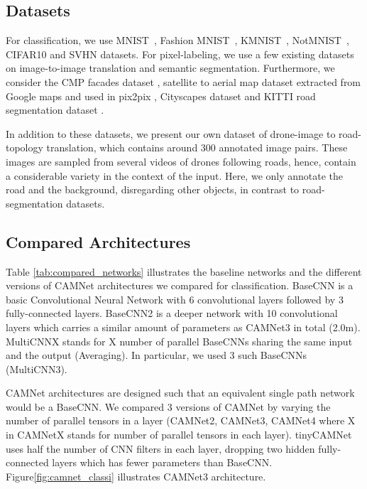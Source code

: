 \documentclass[10pt,twocolumn,letterpaper]{article}
\begin{document}
\subsection{Datasets}
\label{ss:ex_datasets}
\vspace{-0.05in}
For classification, we use MNIST~\cite{mnist}, Fashion MNIST~\cite{fashion}, KMNIST~\cite{kmnist}, NotMNIST~\cite{notmnist}, CIFAR10 \cite{cifar10} and SVHN \cite{svhn} datasets.  For pixel-labeling, we use a few existing datasets on image-to-image translation and semantic segmentation. Furthermore, we consider the CMP facades dataset \cite{Tylecek13}, satellite to aerial map dataset extracted from Google maps and used in pix2pix \cite{isola2017image}, Cityscapes dataset \cite{Cordts2016Cityscapes} and KITTI road segmentation dataset \cite{Fritsch2013ITSC}.  

In addition to these datasets, we present our own dataset of drone-image to road-topology translation, which contains around 300 annotated image pairs. These images are sampled from several videos of drones following roads, hence, contain a considerable variety in the context of the input. 
Here, we only annotate the road and the background, disregarding other objects, in contrast to road-segmentation datasets.


\subsection{Compared Architectures}
\label{ss:compared_archi}
\vspace{-0.05in}
Table \ref{tab:compared_networks} illustrates the baseline networks and the different versions of CAMNet architectures we compared for classification. BaseCNN is a basic Convolutional Neural Network with 6 convolutional layers followed by 3 fully-connected layers. BaseCNN2 is a deeper network with 10 convolutional layers which carries a similar amount of parameters as CAMNet3 in total (2.0m). MultiCNNX stands for X number of parallel BaseCNNs sharing the same input and the output (Averaging). In particular, we used 3 such BaseCNNs (MultiCNN3).

CAMNet architectures are designed such that an equivalent single path network would be a BaseCNN. We compared 3 versions of CAMNet by varying the number of parallel tensors in a layer (CAMNet2, CAMNet3, CAMNet4 where X in CAMNetX stands for number of parallel tensors in each layer). tinyCAMNet uses half the number of CNN filters in each layer, dropping two hidden fully-connected layers which has fewer parameters than BaseCNN.  Figure\ref{fig:camnet_classi} illustrates CAMNet3 architecture.
\end{document}

